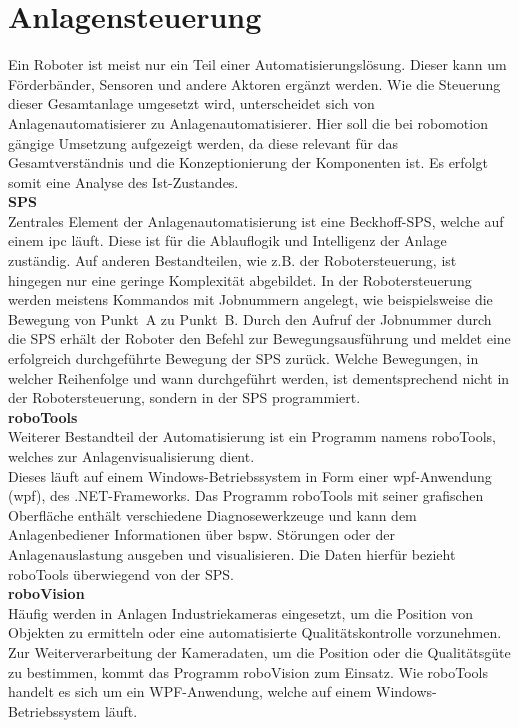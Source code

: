 \documentclass[ a4paper,
                oneside,
                toc=bibliography,
                toc=listof
                ]{scrbook}
\begin{document}
   	\section{Anlagensteuerung}
   	Ein Roboter ist meist nur ein Teil einer Automatisierungslösung. Dieser kann um Förderbänder, Sensoren und andere Aktoren ergänzt werden. Wie die Steuerung dieser Gesamtanlage umgesetzt wird, unterscheidet sich von Anlagenautomatisierer zu Anlagenautomatisierer. Hier soll die bei \glqq robomotion\grqq{} gängige Umsetzung aufgezeigt werden, da diese relevant für das Gesamtverständnis und die Konzeptionierung der Komponenten ist. Es erfolgt somit eine Analyse des Ist-Zustandes.\vspace{0.5\baselineskip}\\
   	\textbf{SPS}\\
   	Zentrales Element der Anlagenautomatisierung ist eine Beckhoff-SPS, welche auf einem \ac{ipc} läuft. Diese ist für die Ablauflogik und \glqq Intelligenz\grqq{} der Anlage zuständig. Auf anderen Bestandteilen, wie z.B. der Robotersteuerung, ist hingegen nur eine geringe Komplexität abgebildet. In der Robotersteuerung werden meistens Kommandos mit Jobnummern angelegt, wie beispielsweise die Bewegung von Punkt~A zu Punkt~B. Durch den Aufruf der Jobnummer durch die SPS erhält der Roboter den Befehl zur Bewegungsausführung und meldet eine erfolgreich durchgeführte Bewegung der SPS zurück. Welche Bewegungen, in welcher Reihenfolge und wann durchgeführt werden, ist dementsprechend nicht in der Robotersteuerung, sondern in der SPS programmiert.\vspace{0.5\baselineskip}\\
   	\textbf{roboTools} \\
   	Weiterer Bestandteil der Automatisierung ist ein Programm namens \glqq roboTools\grqq, welches zur Anlagenvisualisierung dient.\\
   	Dieses läuft auf einem Windows-Betriebssystem in Form einer \ac{wpf}-Anwendung (\acl{wpf}), des \glqq .NET-Frameworks\grqq. Das Programm roboTools mit seiner grafischen Oberfläche enthält verschiedene Diagnosewerkzeuge und kann dem Anlagenbediener Informationen über bspw. Störungen oder der Anlagenauslastung ausgeben und visualisieren. Die Daten hierfür bezieht roboTools überwiegend von der SPS. \vspace{0.5\baselineskip}\\
   	\textbf{roboVision}\\
   	Häufig werden in Anlagen Industriekameras eingesetzt, um die Position von Objekten zu ermitteln oder eine automatisierte Qualitätskontrolle vorzunehmen. Zur Weiterverarbeitung der Kameradaten, um die Position oder die Qualitätsgüte zu bestimmen, kommt das Programm \glqq roboVision\grqq{} zum Einsatz. Wie roboTools handelt es sich um ein WPF-Anwendung, welche auf einem Windows-Betriebssystem läuft.\vspace{0.5\baselineskip}\\
\end{document}
